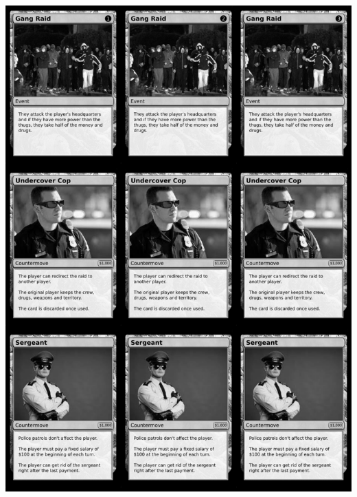\documentclass[a4paper]{article}
\begin{document}
\begin{center}
	\centering
	\includegraphics[width=190.5mm,height=266.7mm]{output/temp/page30.png}
\end{center}

\newpage
\end{document}
